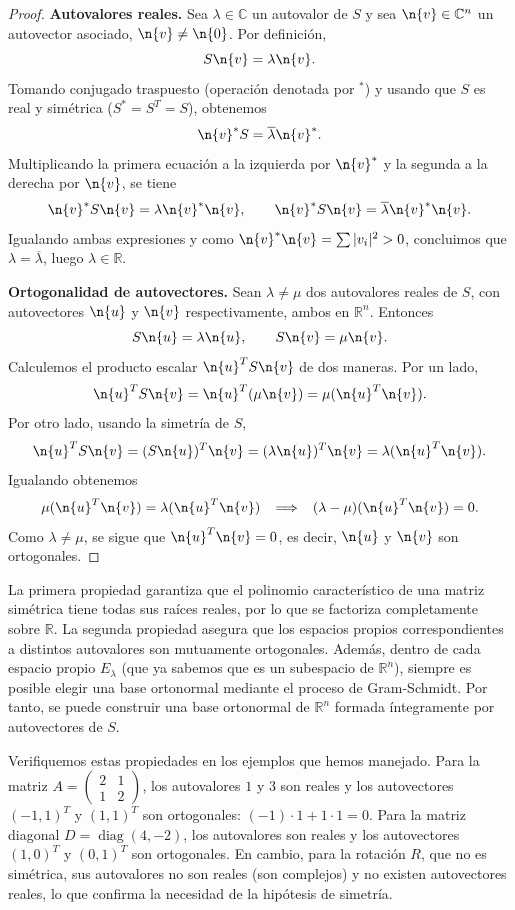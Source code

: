\begin{proof}
\textbf{Autovalores reales.} Sea $\lambda\in\mathbb{C}$ un autovalor de $S$ y sea $\n{v}\in\mathbb{C}^n$ un autovector asociado, $\n{v}\neq \n{0}$. Por definición,
\[
S\n{v} = \lambda \n{v}.
\]
Tomando conjugado traspuesto (operación denotada por $^*$) y usando que $S$ es real y simétrica ($S^* = S^T = S$), obtenemos
\[
\n{v}^* S = \overline{\lambda} \n{v}^*.
\]
Multiplicando la primera ecuación a la izquierda por $\n{v}^*$ y la segunda a la derecha por $\n{v}$, se tiene
\[
\n{v}^* S\n{v} = \lambda \n{v}^*\n{v}, \qquad 
\n{v}^* S\n{v} = \overline{\lambda} \n{v}^*\n{v}.
\]
Igualando ambas expresiones y como $\n{v}^*\n{v} = \sum |v_i|^2 > 0$, concluimos que $\lambda = \overline{\lambda}$, luego $\lambda\in\mathbb{R}$.

\textbf{Ortogonalidad de autovectores.} Sean $\lambda\neq \mu$ dos autovalores reales de $S$, con autovectores $\n{u}$ y $\n{v}$ respectivamente, ambos en $\mathbb{R}^n$. Entonces
\[
S\n{u} = \lambda \n{u}, \qquad S\n{v} = \mu \n{v}.
\]
Calculemos el producto escalar $\n{u}^T S\n{v}$ de dos maneras. Por un lado,
\[
\n{u}^T S\n{v} = \n{u}^T (\mu \n{v}) = \mu (\n{u}^T\n{v}).
\]
Por otro lado, usando la simetría de $S$,
\[
\n{u}^T S\n{v} = (S\n{u})^T \n{v} = (\lambda \n{u})^T \n{v} = \lambda (\n{u}^T\n{v}).
\]
Igualando obtenemos
\[
\mu (\n{u}^T\n{v}) = \lambda (\n{u}^T\n{v}) \quad\Longrightarrow\quad (\lambda - \mu)(\n{u}^T\n{v}) = 0.
\]
Como $\lambda \neq \mu$, se sigue que $\n{u}^T\n{v} = 0$, es decir, $\n{u}$ y $\n{v}$ son ortogonales.
\end{proof}


La primera propiedad garantiza que el polinomio característico de una matriz simétrica tiene todas sus raíces reales, por lo que se factoriza completamente sobre $\mathbb{R}$. La segunda propiedad asegura que los espacios propios correspondientes a distintos autovalores son mutuamente ortogonales. Además, dentro de cada espacio propio $E_\lambda$ (que ya sabemos que es un subespacio de $\mathbb{R}^n$), siempre es posible elegir una base ortonormal mediante el proceso de Gram-Schmidt. Por tanto, se puede construir una base ortonormal de $\mathbb{R}^n$ formada íntegramente por autovectores de $S$.

Verifiquemos estas propiedades en los ejemplos que hemos manejado. Para la matriz $A = \begin{pmatrix}2&1\\1&2\end{pmatrix}$, los autovalores $1$ y $3$ son reales y los autovectores $(-1,1)^T$ y $(1,1)^T$ son ortogonales: $(-1)\cdot 1 + 1\cdot 1 = 0$. Para la matriz diagonal $D = \operatorname{diag}(4,-2)$, los autovalores son reales y los autovectores $(1,0)^T$ y $(0,1)^T$ son ortogonales. En cambio, para la rotación $R$, que no es simétrica, sus autovalores no son reales (son complejos) y no existen autovectores reales, lo que confirma la necesidad de la hipótesis de simetría.



